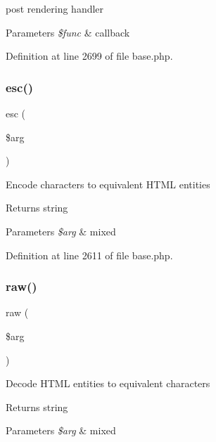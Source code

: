 post rendering handler 
\begin{DoxyParams}{Parameters}
{\em \$func} & callback \\
\hline
\end{DoxyParams}


Definition at line 2699 of file base.\+php.

\hypertarget{class_view_a5bd4df9fdd31ef4ff4e020a04245a34b}{}\label{class_view_a5bd4df9fdd31ef4ff4e020a04245a34b} 
\subsubsection{\texorpdfstring{esc()}{esc()}}
{\footnotesize\ttfamily esc (\begin{DoxyParamCaption}\item[{}]{\$arg }\end{DoxyParamCaption})}

Encode characters to equivalent H\+T\+ML entities \begin{DoxyReturn}{Returns}
string 
\end{DoxyReturn}

\begin{DoxyParams}{Parameters}
{\em \$arg} & mixed \\
\hline
\end{DoxyParams}


Definition at line 2611 of file base.\+php.

\hypertarget{class_view_ae28ae43a12ee2a48b262f167ec9042da}{}\label{class_view_ae28ae43a12ee2a48b262f167ec9042da} 
\subsubsection{\texorpdfstring{raw()}{raw()}}
{\footnotesize\ttfamily raw (\begin{DoxyParamCaption}\item[{}]{\$arg }\end{DoxyParamCaption})}

Decode H\+T\+ML entities to equivalent characters \begin{DoxyReturn}{Returns}
string 
\end{DoxyReturn}

\begin{DoxyParams}{Parameters}
{\em \$arg} & mixed \\
\hline
\end{DoxyParams}


